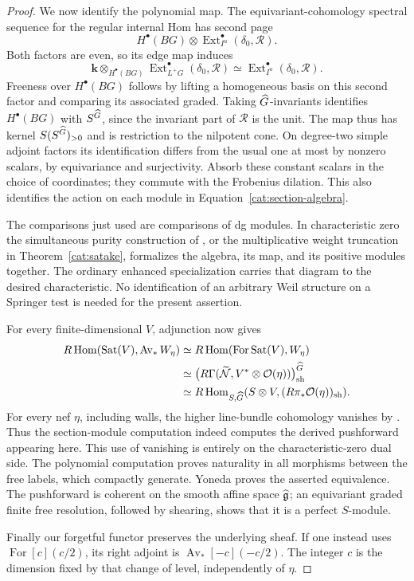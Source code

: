 \begin{proof}
We now identify the polynomial map. The equivariant-cohomology
spectral sequence for the regular internal Hom has second page
\[
 H^{\bullet}(BG)\otimes
       \operatorname{Ext}^{\bullet}_{I^u}(\delta_0,\mathcal R).
\]
Both factors are even, so its edge map induces
\[
 \mathbf k\otimes_{H^{\bullet}(BG)}
       \operatorname{Ext}^{\bullet}_{L^+G}(\delta_0,\mathcal R)
 \simeq
       \operatorname{Ext}^{\bullet}_{I^u}(\delta_0,\mathcal R).
\]
Freeness over $H^{\bullet}(BG)$ follows by lifting a homogeneous
basis on this second factor and comparing its associated graded.
Taking $\widehat G$-invariants identifies $H^{\bullet}(BG)$ with
$S^{\widehat G}$, since the invariant part of $\mathcal R$ is the unit.
The map thus has kernel $S(S^{\widehat G})_{>0}$ and is restriction to
the nilpotent cone. On degree-two simple adjoint factors its
identification differs from the usual one at most by nonzero
scalars, by equivariance and surjectivity. Absorb these constant
scalars in the choice of coordinates; they commute with the
Frobenius dilation. This also identifies the action on each module
in Equation~\eqref{cat:section-algebra}.

The comparisons just used are comparisons of dg modules. In
characteristic zero the simultaneous purity construction of
\cite[Proposition~9.5.2 and Lemma~9.5.3]{ABG}, or the multiplicative
weight truncation in Theorem~\ref{cat:satake}, formalizes the
algebra, its map, and its positive modules together. The ordinary
enhanced specialization carries that diagram to the desired
characteristic. No identification of an arbitrary Weil structure
on a Springer test is needed for the present assertion.

For every finite-dimensional $V$, adjunction now gives
\begin{align*}
 R\operatorname{Hom}(\operatorname{Sat}(V),\operatorname{Av}_*W_\eta)
 &\simeq R\operatorname{Hom}(\operatorname{For}\operatorname{Sat}(V),W_\eta)\\
 &\simeq
   \bigl(R\Gamma(\widetilde{\mathcal N},
                    V^*\otimes\mathcal O(\eta))\bigr)^{\widehat G}_{\rm sh}\\
 &\simeq R\operatorname{Hom}_{S,\widehat G}
       (S\otimes V,(R\pi_*\mathcal O(\eta))_{\rm sh}).
\end{align*}
For every nef $\eta$, including walls, the higher line-bundle
cohomology vanishes by \cite[Theorem~2.4 and Remark~2.7(2)]{Broer}.
Thus the section-module computation indeed computes the derived
pushforward appearing here. This use of vanishing is entirely on
the characteristic-zero dual side. The polynomial computation
proves naturality in all morphisms between the free labels, which
compactly generate. Yoneda proves the asserted equivalence.
The pushforward is coherent on the smooth affine space $\widehat{\mathfrak g}$;
an equivariant graded finite free resolution, followed by shearing,
shows that it is a perfect $S$-module.

Finally our forgetful functor preserves the underlying sheaf. If
one instead uses $\operatorname{For}[c](c/2)$, its right adjoint
is $\operatorname{Av}_*[-c](-c/2)$. The integer $c$ is the
dimension fixed by that change of level, independently of $\eta$.
\end{proof}

